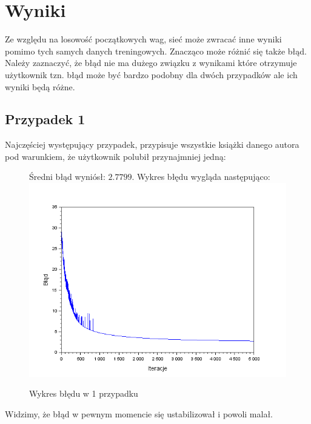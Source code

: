 \section{Wyniki}
    Ze względu na losowość początkowych wag, sieć może zwracać inne wyniki pomimo
    tych samych danych treningowych. Znacząco może różnić się także błąd. Należy
    zaznaczyć, że błąd nie ma dużego związku z wynikami które otrzymuje użytkownik
    tzn. błąd może być bardzo podobny dla dwóch przypadków ale ich wyniki będą różne.

    \subsection{Przypadek 1}
        Najczęściej występujący przypadek, przypisuje wszystkie książki danego autora
        pod warunkiem, że użytkownik polubił przynajmniej jedną:

            \begin{figure}[H]
                \centering

                Średni błąd wyniósł: $2.7799$. Wykres błędu wygląda następująco:
                \includegraphics[width=\textwidth]{img/wykres_1.png}

                \caption{Wykres błędu w 1 przypadku}

                \label{rys:1}
            \end{figure}

            Widzimy, że błąd w pewnym momencie się ustabilizował i powoli malał.


